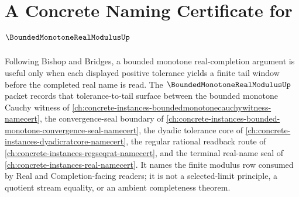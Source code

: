 \chapter{A Concrete Naming Certificate for $\BoundedMonotoneRealModulusUp$}
\label{ch:concrete-instances-bounded-monotone-real-modulus-namecert}

Following Bishop and Bridges, a bounded monotone real-completion argument is useful only when each displayed positive tolerance yields a finite tail window before the completed real name is read. The $\BoundedMonotoneRealModulusUp$ packet records that tolerance-to-tail surface between the bounded monotone Cauchy witness of \autoref{ch:concrete-instances-boundedmonotonecauchywitness-namecert}, the convergence-seal boundary of \autoref{ch:concrete-instances-bounded-monotone-convergence-seal-namecert}, the dyadic tolerance core of \autoref{ch:concrete-instances-dyadicratcore-namecert}, the regular rational readback route of \autoref{ch:concrete-instances-regseqrat-namecert}, and the terminal real-name seal of \autoref{ch:concrete-instances-real-namecert}. It names the finite modulus row consumed by Real and Completion-facing readers; it is not a selected-limit principle, a quotient stream equality, or an ambient completeness theorem.

